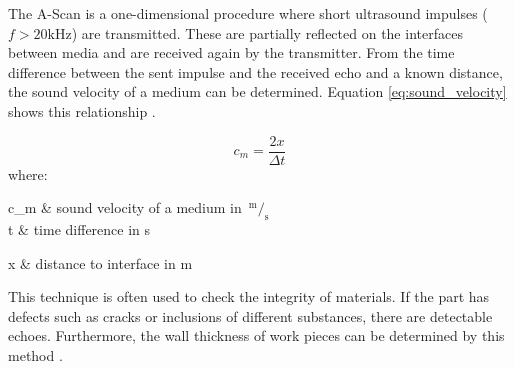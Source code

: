 The A-Scan is a one-dimensional procedure where short ultrasound impulses ($f > 20 \text{kHz}$) are transmitted. These are partially reflected on the interfaces between media and are received again by the transmitter. From the time difference between the sent impulse and the received echo and a known distance, the sound velocity of a medium can be determined. Equation \ref{eq:sound_velocity} shows this relationship \cite{ultrasound}.

\begin{equation}
c_m = \dfrac{2x}{\Delta t}
\label{eq:sound_velocity}
\end{equation}
where:
\begin{multicols}{2}
	\begin{conditions}
		c_m & sound velocity of a medium in $\,^{\text{m}}\!/_{\text{s}}$ \\
		\Delta t & time difference in s
	\end{conditions}
	\begin{conditions}
		x & distance to interface in m
	\end{conditions}
\end{multicols}

This technique is often used to check the integrity of materials. If the part has defects such as cracks or inclusions of different substances, there are detectable echoes. Furthermore, the wall thickness of work pieces can be determined by this method \cite{ultrasound}.
